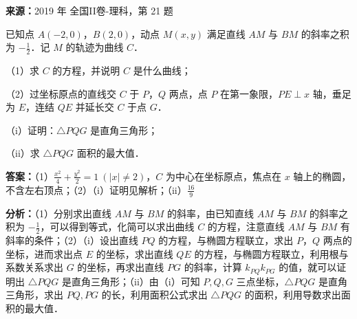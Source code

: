 \begin{question}[points=12]
\textbf{来源：}2019 年 全国II卷-理科，第 21 题\par
已知点 $A(-2,0)$，$B(2,0)$，动点 $M(x,y)$ 满足直线 $AM$ 与 $BM$ 的斜率之积为 $-\frac{1}{2}$．记 $M$ 的轨迹为曲线 $C$．

（1）求 $C$ 的方程，并说明 $C$ 是什么曲线；

（2）过坐标原点的直线交 $C$ 于 $P$，$Q$ 两点，点 $P$ 在第一象限，$PE\perp x$ 轴，垂足为 $E$，连结 $QE$ 并延长交 $C$ 于点 $G$．

     （i）证明：$\triangle PQG$ 是直角三角形；

     （ii）求 $\triangle PQG$ 面积的最大值．
\begin{solution}
\textbf{答案：}（1）$\frac{x^2}{4}+\frac{y^2}{2}=1\ (|x|\neq 2)$，$C$ 为中心在坐标原点，焦点在 $x$ 轴上的椭圆，不含左右顶点；（2）（i）证明见解析；（ii）$\frac{16}{9}$

\textbf{分析：}（1）分别求出直线 $AM$ 与 $BM$ 的斜率，由已知直线 $AM$ 与 $BM$ 的斜率之积为 $-\frac{1}{2}$，可以得到等式，化简可以求出曲线 $C$ 的方程，注意直线 $AM$ 与 $BM$ 有斜率的条件；（2）（i）设出直线 $PQ$ 的方程，与椭圆方程联立，求出 $P$，$Q$ 两点的坐标，进而求出点 $E$ 的坐标，求出直线 $QE$ 的方程，与椭圆方程联立，利用根与系数关系求出 $G$ 的坐标，再求出直线 $PG$ 的斜率，计算 $k_{PQ}k_{PG}$ 的值，就可以证明出 $\triangle PQG$ 是直角三角形；（ii）由（i）可知 $P,Q,G$ 三点坐标，$\triangle PQG$ 是直角三角形，求出 $PQ,PG$ 的长，利用面积公式求出 $\triangle PQG$ 的面积，利用导数求出面积的最大值．


\end{solution}
\end{question}
